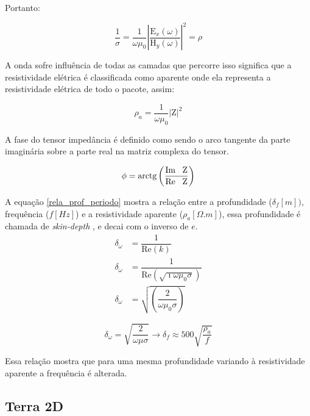         Portanto:
        
        \begin{equation}
         \dfrac{1}{\sigma} = \dfrac{1}{\omega \mu_0} \left | \dfrac{\textrm{E}_x(\omega)}{\textrm{H}_y(\omega)} \right | ^2 = \rho
        \end{equation}
        
        A onda sofre influência de todas as camadas que percorre isso significa que a resistividade elétrica é classificada como aparente onde ela representa a resistividade elétrica de todo o pacote, assim:
        
        \begin{equation}
         \rho_a = \dfrac{1}{\omega \mu_0} \left | \textrm{Z} \right | ^2
        \end{equation}
        
        A fase do tensor impedância é definido como sendo o arco tangente da parte imaginária sobre a parte real na matriz complexa do tensor.
        
        \begin{equation}
         \phi = \textrm{arctg} \left ( \dfrac{\textrm{Im \, Z}}{\textrm{Re \, Z}} \right )
        \end{equation}
        
        A equação \ref{rela_prof_periodo} mostra a relação entre a profundidade
	($\delta_f[m])$, frequência ($f[Hz]$) e a resistividade aparente ($\rho_a[\Omega.m]$), essa 
	profundidade é chamada de \textit{skin-depth} \cite{eletromag8hayt}, e decai com o inverso de $e$.
	\begin{align*}
	 \delta_\omega & = \dfrac{1}{\textrm{Re}(k)} \\
	  \delta_\omega & = \dfrac{1}{\textrm{Re} \left (\sqrt{\imath \omega \mu_0 \sigma} \right)}  \\
	  \delta_\omega & = \sqrt{ \left (\dfrac{2}{\omega \mu_0 \sigma} \right )}
	\end{align*}

	
	\begin{equation}
	 \label{rela_prof_periodo}
	 \delta_\omega = \sqrt{\frac{2}{\omega \mu \sigma}} \longrightarrow \delta_f \approx 500  \sqrt{\frac{\rho_a}{f}}
	\end{equation}
	
	Essa relação mostra que para uma mesma profundidade variando à resistividade
	aparente a frequência é alterada.
        
   
        \subsection{Terra 2D}
        
